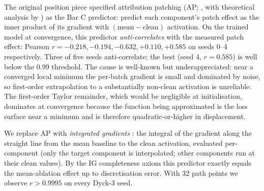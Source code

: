 \documentclass[11pt,letterpaper]{article}
\begin{document}
The original position piece specified attribution patching (AP; \citealp{nanda2023attribution}, with theoretical analysis by \citealp{kramar2024atp}) as the Bar C predictor: predict each component's patch effect as the inner product of its gradient with $(\mathrm{mean} - \mathrm{clean})$ activation. On the trained model at convergence, this predictor \emph{anti-correlates} with the measured patch effect: Pearson $r = -0.218, -0.194, -0.632, +0.110, +0.585$ on seeds 0--4 respectively. Three of five seeds anti-correlate; the best (seed 4, $r = 0.585$) is well below the 0.99 threshold. The cause is well-known but underappreciated: near a converged local minimum the per-batch gradient is small and dominated by noise, so first-order extrapolation to a substantially non-clean activation is unreliable. The first-order Taylor remainder, which would be negligible at initialisation, dominates at convergence because the function being approximated is the loss surface near a minimum and is therefore quadratic-or-higher in displacement.

We replace AP with \emph{integrated gradients} \citep[IG;][]{sundararajan2017axiomatic}: the integral of the gradient along the straight line from the mean baseline to the clean activation, evaluated per-component (only the target component is interpolated; other components run at their clean values). By the IG completeness axiom this predictor exactly equals the mean-ablation effect up to discretisation error. With 32 path points we observe $r > 0.9995$ on every Dyck-3 seed.
\end{document}
